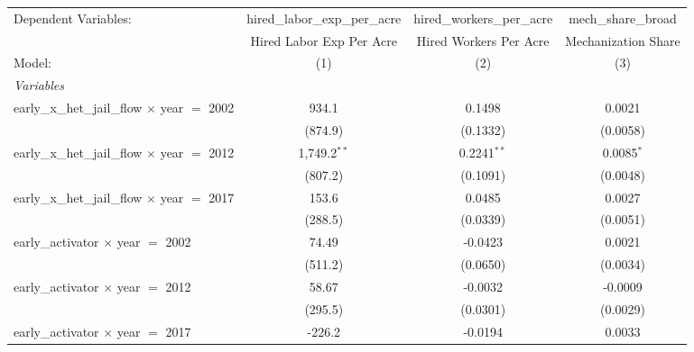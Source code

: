 
\begingroup
\centering
\begin{tabular}{lccc}
   \tabularnewline \midrule \midrule
   Dependent Variables:                                  & hired\_labor\_exp\_per\_acre     & hired\_workers\_per\_acre    & mech\_share\_broad\\    
                                                         & Hired Labor Exp Per Acre         & Hired Workers Per Acre       & Mechanization Share \\   
   Model:                                                & (1)                              & (2)                          & (3)\\  
   \midrule
   \emph{Variables}\\
   early\_x\_het\_jail\_flow $\times$ year $=$ 2002      & 934.1                            & 0.1498                       & 0.0021\\   
                                                         & (874.9)                          & (0.1332)                     & (0.0058)\\   
   early\_x\_het\_jail\_flow $\times$ year $=$ 2012      & 1,749.2$^{**}$                   & 0.2241$^{**}$                & 0.0085$^{*}$\\   
                                                         & (807.2)                          & (0.1091)                     & (0.0048)\\   
   early\_x\_het\_jail\_flow $\times$ year $=$ 2017      & 153.6                            & 0.0485                       & 0.0027\\   
                                                         & (288.5)                          & (0.0339)                     & (0.0051)\\   
   early\_activator $\times$ year $=$ 2002               & 74.49                            & -0.0423                      & 0.0021\\   
                                                         & (511.2)                          & (0.0650)                     & (0.0034)\\   
   early\_activator $\times$ year $=$ 2012               & 58.67                            & -0.0032                      & -0.0009\\   
                                                         & (295.5)                          & (0.0301)                     & (0.0029)\\   
   early\_activator $\times$ year $=$ 2017               & -226.2                           & -0.0194                      & 0.0033\\   

\end{tabular}
